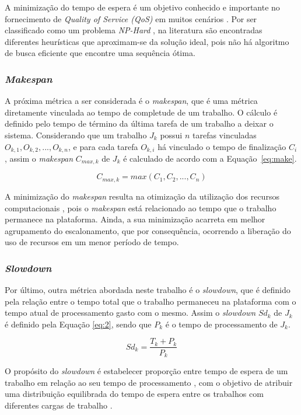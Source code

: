 A minimização do tempo de espera é um objetivo conhecido e importante no fornecimento de \textit{Quality of Service (QoS)} em muitos cenários \cite{Ye2007}. Por ser classificado como um problema \textit{NP-Hard} \cite{Kubiak1993}, na literatura são encontradas diferentes heurísticas que aproximam-se da solução ideal, pois não há algoritmo de busca eficiente que encontre uma sequência ótima.

\subsubsection{\textit{Makespan}}
A próxima métrica a ser considerada é o \textit{makespan}, que é uma métrica diretamente vinculada ao tempo de completude de um trabalho. O cálculo é definido pelo tempo de término da última tarefa de um trabalho a deixar o sistema. Considerando que um trabalho $J_k$ possui $n$ tarefas vinculadas $O_{k,1}, O_{k,2}, ..., O_{k,n}$, e para cada tarefa $O_{k,i}$ há vinculado o tempo de finalização $C_i$, assim o \textit{makespan} $C_{max, k}$ de $J_k$ é calculado de acordo com a Equação~\ref{eq:make}.

\begin{equation} \label{eq:make}
C_{max,k} = max(C_1, C_2, ..., C_n) 
\end{equation}

A minimização do \textit{makespan} resulta na otimização da utilização dos recursos computacionais \cite{pinedo2012scheduling}, pois o \textit{makespan} está relacionado ao tempo que o trabalho permanece na plataforma.
Ainda, a sua minimização acarreta em melhor agrupamento do escalonamento, que por consequência, ocorrendo a liberação do uso de recursos em um menor período de tempo.

\subsubsection{\textit{Slowdown}}
Por último, outra métrica abordada neste trabalho é o \textit{slowdown}, que é definido pela relação entre o tempo total que o trabalho permaneceu na plataforma com o tempo atual de processamento gasto com o mesmo. Assim o \textit{slowdown} $Sd_k$ de $J_k$  é definido pela Equação \ref{eq:2}, sendo que \(P_{k}\) é o tempo de processamento de \(J_k\).

\begin{equation} \label{eq:2}
Sd_{k} = \frac{T_{k} + P_{k}}{P_{k}}
\end{equation}

O propósito do \textit{slowdown} é estabelecer  proporção entre tempo de espera de um trabalho em relação ao seu tempo de processamento \cite{Maccio2018}, com o objetivo de atribuir uma distribuição equilibrada do tempo de espera entre os trabalhos com diferentes cargas de trabalho \cite{CarastanSantos2019}.

